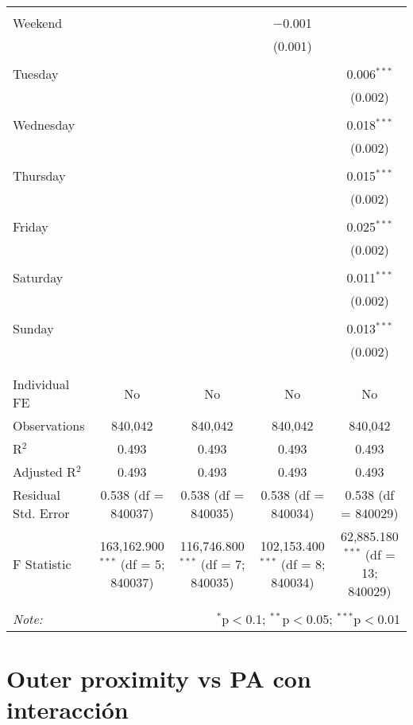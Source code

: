 \documentclass[
]{article}
\begin{document}
\begin{table}[!htbp]
{\begin{tabular}{@{\extracolsep{5pt}}lcccc}
  & & & & \\ 
 Weekend &  &  & $-$0.001 &  \\ 
  &  &  & (0.001) &  \\ 
  & & & & \\ 
 Tuesday &  &  &  & 0.006$^{***}$ \\ 
  &  &  &  & (0.002) \\ 
  & & & & \\ 
 Wednesday &  &  &  & 0.018$^{***}$ \\ 
  &  &  &  & (0.002) \\ 
  & & & & \\ 
 Thursday &  &  &  & 0.015$^{***}$ \\ 
  &  &  &  & (0.002) \\ 
  & & & & \\ 
 Friday &  &  &  & 0.025$^{***}$ \\ 
  &  &  &  & (0.002) \\ 
  & & & & \\ 
 Saturday &  &  &  & 0.011$^{***}$ \\ 
  &  &  &  & (0.002) \\ 
  & & & & \\ 
 Sunday &  &  &  & 0.013$^{***}$ \\ 
  &  &  &  & (0.002) \\ 
  & & & & \\ 
\hline \\[-1.8ex] 
Individual FE & No & No & No & No \\ 
Observations & 840,042 & 840,042 & 840,042 & 840,042 \\ 
R$^{2}$ & 0.493 & 0.493 & 0.493 & 0.493 \\ 
Adjusted R$^{2}$ & 0.493 & 0.493 & 0.493 & 0.493 \\ 
Residual Std. Error & 0.538 (df = 840037) & 0.538 (df = 840035) & 0.538 (df = 840034) & 0.538 (df = 840029) \\ 
F Statistic & 163,162.900$^{***}$ (df = 5; 840037) & 116,746.800$^{***}$ (df = 7; 840035) & 102,153.400$^{***}$ (df = 8; 840034) & 62,885.180$^{***}$ (df = 13; 840029) \\ 
\hline 
\hline \\[-1.8ex] 
\textit{Note:}  & \multicolumn{4}{r}{$^{*}$p$<$0.1; $^{**}$p$<$0.05; $^{***}$p$<$0.01} \\ 
\end{tabular}
} 
\end{table} 
\newpage
\section{Outer proximity vs PA con interacción}
\end{document}
